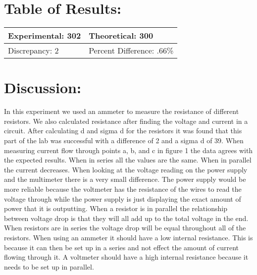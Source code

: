 \documentclass{article}
\begin{document}
\section*{Table of Results:}
\begin{center}
\begin{tabular}{|l|l|}
\hline
	Experimental: 302 & Theoretical: 300  \\ \hline
	Discrepancy: 2   & Percent Difference: .66\% \\
\hline
\end{tabular}
\end{center}

\section*{Discussion:}
\doublespace
In this experiment we used an ammeter to measure the resistance of different resistors.  We also calculated resistance after finding the voltage and current in a circuit.  After calculating d and sigma d for the resistors it was found that this part of the lab was successful with a difference of 2 and a sigma d of 39.  When measuring current flow through points a, b, and c in figure 1 the data agrees with the expected results.  When in series all the values are the same.  When in parallel the current decreases.  When looking at the voltage reading on the power supply and the multimeter there is a very small difference.  The power supply would be more reliable because the voltmeter has the resistance of the wires to read the voltage through while the power supply is just displaying the exact amount of power that it is outputting.  When a resistor is in parallel the relationship between voltage drop is that they will all add up to the total voltage in the end.  When resistors are in series the voltage drop will be equal throughout all of the resistors.  When using an ammeter it should have a low internal resistance.  This is because it can then be set up in a series and not effect the amount of current flowing through it.  A voltmeter should have a high internal resistance because it needs to be set up in parallel.  
\end{document}
